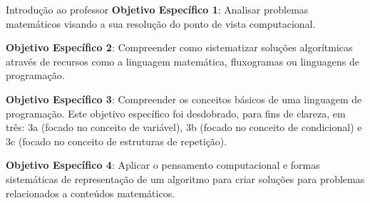 \begin{apresentacao}{Introdução ao professor}
\textbf{Objetivo Específico 1}: Analisar problemas matemáticos visando a sua resolução do ponto de vista computacional.

\textbf{Objetivo Específico 2}: Compreender como sistematizar soluções algorítmicas através de recursos como a linguagem matemática, fluxogramas ou linguagens de programação.

\textbf{Objetivo Específico 3}: Compreender os conceitos básicos de uma linguagem de programação. Este objetivo específico foi desdobrado, para fins de clareza, em três: 3a (focado no conceito de variável), 3b (focado no conceito de condicional) e 3c (focado no conceito de estruturas de repetição).

\textbf{Objetivo Específico 4}: Aplicar o pensamento computacional e formas sistemáticas de representação de um algoritmo para criar soluções para problemas relacionados a conteúdos matemáticos.
\end{apresentacao}

